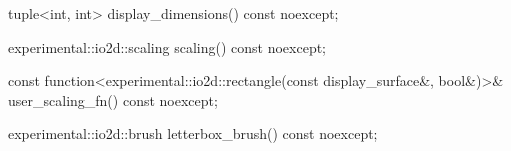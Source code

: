 \begin{itemdecl}
    tuple<int, int> display_dimensions() const noexcept;
\end{itemdecl}
\begin{itemdescr}
	\pnum
	\returns
	
\end{itemdescr}

\begin{itemdecl}
    experimental::io2d::scaling scaling() const noexcept;
\end{itemdecl}
\begin{itemdescr}
	\pnum
	\returns
	
\end{itemdescr}

\begin{itemdecl}
    const function<experimental::io2d::rectangle(const display_surface&,
      bool&)>& user_scaling_fn() const noexcept;
\end{itemdecl}
\begin{itemdescr}
	\pnum
	\returns
	
\end{itemdescr}

\begin{itemdecl}
    experimental::io2d::brush letterbox_brush() const noexcept;
\end{itemdecl}
\begin{itemdescr}
	\pnum
	\returns
	
\end{itemdescr}
